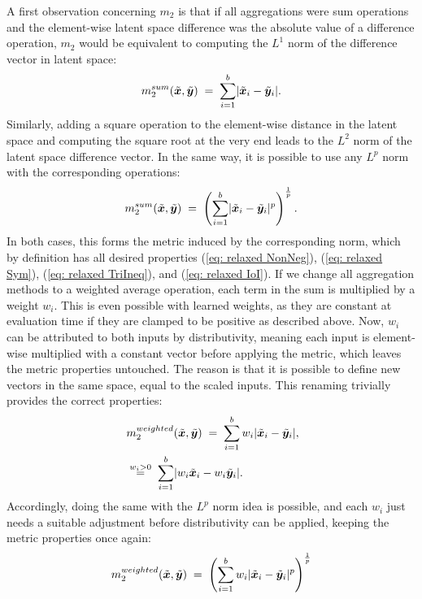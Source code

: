 A first observation concerning $m_2$ is that if all aggregations were sum operations and the element-wise latent space difference was the absolute value of a difference operation, $m_2$ would be equivalent to computing the $L^1$ norm of the difference vector in latent space:
\begin{equation*}
    m_2^{sum}( \tilde{{\bm{x}}},\tilde{{\bm{y}}} ) \;=\; \sum_{i=1}^{b} \lvert \tilde{{\bm{x}}}_i - \tilde{{\bm{y}}}_i \rvert.
\end{equation*}
Similarly, adding a square operation to the element-wise distance in the latent space and computing the square root at the very end leads to the $L^2$ norm of the latent space difference vector. In the same way, it is possible to use any $L^p$ norm with the corresponding operations:
\begin{equation*} 
    m_2^{sum}( \tilde{{\bm{x}}},\tilde{{\bm{y}}} ) \;=\; \left( \sum_{i=1}^{b} \lvert \tilde{{\bm{x}}}_i - \tilde{{\bm{y}}}_i \rvert^p \right) ^ \frac{1}{p}.
\end{equation*}
In both cases, this forms the metric induced by the corresponding norm, which by definition has all desired properties (\ref{eq: relaxed NonNeg}), (\ref{eq: relaxed Sym}), (\ref{eq: relaxed TriIneq}), and (\ref{eq: relaxed IoI}). If we change all aggregation methods to a weighted average operation, each term in the sum is multiplied by a weight $w_i$. This is even possible with learned weights, as they are constant at evaluation time if they are clamped to be positive as described above. Now, $w_i$ can be attributed to both inputs by distributivity, meaning each input is element-wise multiplied with a constant vector before applying the metric, which leaves the metric properties untouched. The reason is that it is possible to define new vectors in the same space, equal to the scaled inputs. This renaming trivially provides the correct properties:
\begin{align*}
    &m_2^{weighted}( \tilde{{\bm{x}}},\tilde{{\bm{y}}} ) \;=\; \sum_{i=1}^{b} w_i \lvert \tilde{{\bm{x}}}_i - \tilde{{\bm{y}}}_i \rvert, \\ \;&\overset{w_i>0}{=}\; \sum_{i=1}^{b} \lvert w_i \tilde{{\bm{x}}}_i - w_i \tilde{{\bm{y}}}_i \rvert.
\end{align*}
Accordingly, doing the same with the $L^p$ norm idea is possible, and each $w_i$ just needs a suitable adjustment before distributivity can be applied, keeping the metric properties once again:
\begin{align*} 
    &m_2^{weighted}( \tilde{{\bm{x}}},\tilde{{\bm{y}}} ) \;=\; \left( \sum_{i=1}^{b} w_i \lvert \tilde{{\bm{x}}}_i - \tilde{{\bm{y}}}_i \rvert^p \right) ^ \frac{1}{p} \\
\end{align*}
